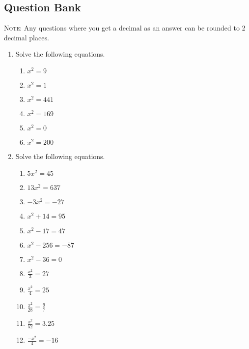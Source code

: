 \documentclass[a4paper,12pt]{article}
\begin{document}
\newpage
\subsection*{Question Bank}

\textsc{Note}: Any questions where you get a decimal as an answer
can be rounded to 2 decimal places.

\begin{enumerate}
\item Solve the following equations.
    \begin{multicols}{2}
    \begin{enumerate}
    \item $x^2 = 9$
    \item $x^2 = 1$
    \item $x^2 = 441$
    \item $x^2 = 169$
    \item $x^2 = 0$
    \item $x^2 = 200$
    \end{enumerate}
    \end{multicols}

\item Solve the following equations.
    \begin{multicols}{2}
    \begin{enumerate}
    \item $5x^2 = 45$
    \item $13x^2 = 637$
    \item $-3x^2 = -27$
    \item $x^2 + 14 = 95$
    \item $x^2 - 17 = 47$
    \item $x^2 - 256 = -87$
    \item $x^2 - 36 = 0$
    \item $\displaystyle\frac{x^2}{3} = 27$
    \item $\displaystyle\frac{x^2}{4} = 25$
    \item $\displaystyle\frac{x^2}{28} = \frac{9}{7}$
    \item $\displaystyle\frac{x^2}{52} = 3.25$
    \item $\displaystyle\frac{-x^2}{4} = -16$
    \end{enumerate}
    \end{multicols}


\end{enumerate}
\end{document}
